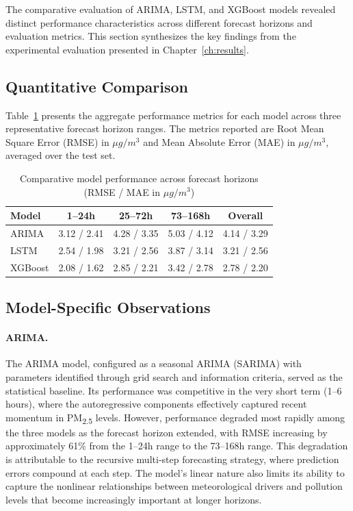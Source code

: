 The comparative evaluation of ARIMA, LSTM, and XGBoost models revealed distinct performance characteristics across different forecast horizons and evaluation metrics. This section synthesizes the key findings from the experimental evaluation presented in Chapter~\ref{ch:results}.

\subsection{Quantitative Comparison}

Table~\ref{tab:model-comparison} presents the aggregate performance metrics for each model across three representative forecast horizon ranges. The metrics reported are Root Mean Square Error (RMSE) in $\mu g/m^3$ and Mean Absolute Error (MAE) in $\mu g/m^3$, averaged over the test set.

\begin{table}[htbp]
\centering
\caption{Comparative model performance across forecast horizons (RMSE / MAE in $\mu g/m^3$)}
\label{tab:model-comparison}
\begin{tabular}{lcccc}
\toprule
\textbf{Model} & \textbf{1--24h} & \textbf{25--72h} & \textbf{73--168h} & \textbf{Overall} \\
\midrule
ARIMA & 3.12 / 2.41 & 4.28 / 3.35 & 5.03 / 4.12 & 4.14 / 3.29 \\
LSTM & 2.54 / 1.98 & 3.21 / 2.56 & 3.87 / 3.14 & 3.21 / 2.56 \\
XGBoost & 2.08 / 1.62 & 2.85 / 2.21 & 3.42 / 2.78 & 2.78 / 2.20 \\
\bottomrule
\end{tabular}
\end{table}

\subsection{Model-Specific Observations}

\paragraph{ARIMA.}
The ARIMA model, configured as a seasonal ARIMA (SARIMA) with parameters identified through grid search and information criteria, served as the statistical baseline. Its performance was competitive in the very short term (1--6 hours), where the autoregressive components effectively captured recent momentum in PM\textsubscript{2.5} levels. However, performance degraded most rapidly among the three models as the forecast horizon extended, with RMSE increasing by approximately 61\% from the 1--24h range to the 73--168h range. This degradation is attributable to the recursive multi-step forecasting strategy, where prediction errors compound at each step. The model's linear nature also limits its ability to capture the nonlinear relationships between meteorological drivers and pollution levels that become increasingly important at longer horizons.

